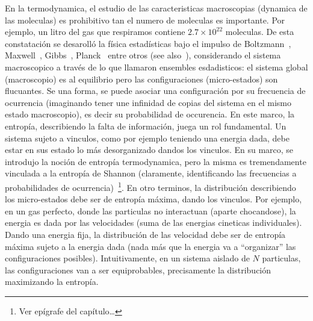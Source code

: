 \label{s:SZ:Desigualdades}




\label{sec:SZ:MaxEnt}

En la termodynamica, el estudio de las caracteristicas macroscopias (dynamica de
las  moleculas) es prohibitivo  tan el  numero de  moleculas es  importante. Por
ejemplo,  un  litro  del  gas  que  respiramos  contiene  $2.7  \times  10^{22}$
moleculas. De esta constataci\'on se desaroll\'o la f\'isica estad\'isticas bajo
el    impulso    de    Boltzmann~\cite{Bol96,   Bol98},    Maxwell~\cite{Max67},
Gibbs~\cite{Gib02},  Planck~\cite{Pla15}  entre  otros (see  also~\cite{Jay65}),
considerando el  sistema macroscopico  a trav\'es de  lo que  llamaron ensembles
esdadisticos:  el  sistema  global  (macroscopio)  es  al  equilibrio  pero  las
configuraciones (micro-estados)  son flucuantes. Se una forma,  se puede asociar
una  configuraci\'on  por su  frecuencia  de  ocurrencia  (imaginando tener  une
infinidad de  copias del sistema  en el mismo  estado macroscopio), es  decir su
probabilidad de occurencia.  En este marco, la entrop\'ia, describiendo la falta
de informaci\'on, juega un rol  fundamental.  Un sistema sujeto a vinculos, como
por  ejemplo teniendo  una  energia dada,  debe  estar en  sus  estado lo  m\'as
desorganizado dandos  los vinculos.   En su marco,  se introdujo la  noci\'on de
entrop\'ia  termodynamica,  pero  la  misma  es  tremendamente  vinculada  a  la
entrop\'ia   de   Shannon   (claramente,   identificando   las   frecuencias   a
probabilidades  de ocurrencia)~\footnote{Ver  ep\'igrafe  del cap\'itulo\ldots}.
En otro terminos,  la distribuci\'on describiendo los micro-estados  debe ser de
entrop\'ia m\'axima, dando los vinculos.  Por ejemplo, en un gas perfecto, donde
las particulas  no interactuan (aparte chocandose),  la energia es  dada por las
velocidades (suma  de las energias  cineticas individuales).  Dando  una energia
fija, la distribuci\'on de las  velocidad debe ser de entrop\'ia m\'axima sujeto
a  la  energia  dada  (nada  m\'as   que  la  energia  va  a  ``organizar''  las
configuraciones  posibles).   Intuitivamente,  en  un  sistema  aislado  de  $N$
particulas,  las  configuraciones  van  a  ser  equiprobables,  precisamente  la
distribuci\'on    maximizando   la   entrop\'ia.     

